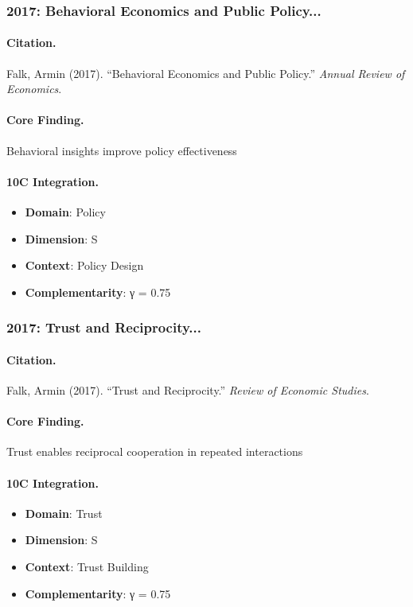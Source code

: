 \subsubsection{2017: Behavioral Economics and Public Policy...}

\paragraph{Citation.}
Falk, Armin (2017). ``Behavioral Economics and Public Policy.''
\textit{Annual Review of Economics}.

\paragraph{Core Finding.}
Behavioral insights improve policy effectiveness

\paragraph{10C Integration.}
\begin{itemize}[nosep]
  \item \textbf{Domain}: Policy
  \item \textbf{Dimension}: S
  \item \textbf{Context}: Policy Design
  \item \textbf{Complementarity}: γ = 0.75
\end{itemize}


\subsubsection{2017: Trust and Reciprocity...}

\paragraph{Citation.}
Falk, Armin (2017). ``Trust and Reciprocity.''
\textit{Review of Economic Studies}.

\paragraph{Core Finding.}
Trust enables reciprocal cooperation in repeated interactions

\paragraph{10C Integration.}
\begin{itemize}[nosep]
  \item \textbf{Domain}: Trust
  \item \textbf{Dimension}: S
  \item \textbf{Context}: Trust Building
  \item \textbf{Complementarity}: γ = 0.75
\end{itemize}


